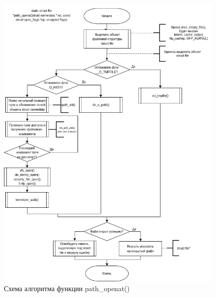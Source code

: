 \begin{figure}[H]
	\centering
	\includegraphics[scale=0.52]{assets/open-path_openat.drawio.png}
	\caption{Схема алгоритма функции path\_openat()}
\end{figure}

